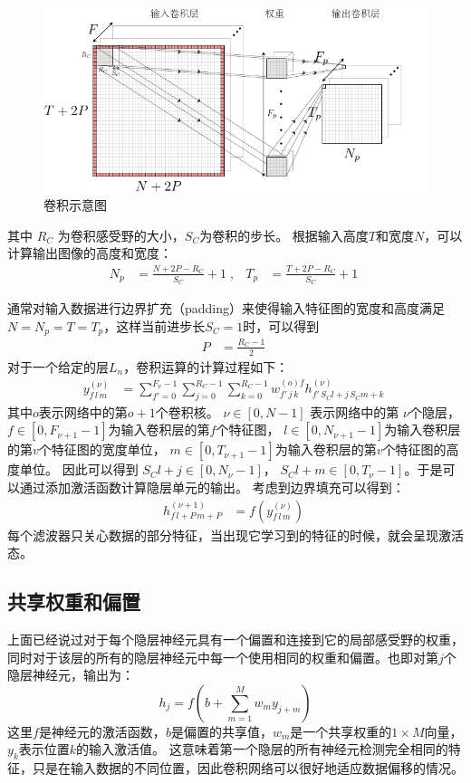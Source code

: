 \begin{figure}[!t]
	\centering
  \includegraphics[width=13.5cm]{figures/networks/conv}
	\caption{卷积示意图}
	\label{fig:conv}
\end{figure}

其中 $R_C$ 为卷积感受野的大小，$S_C$为卷积的步长。
根据输入高度$ T $和宽度$ N $，可以计算输出图像的高度和宽度：
\begin{align}
  N_p&=\frac{N+2P-R_C}{S_C}+1 \;,&
  T_p&=\frac{T+2P-R_C}{S_C}+1\;
\end{align}

通常对输入数据进行边界扩充（padding）来使得输入特征图的宽度和高度满足$ N = N_p = T = T_p $，这样当前进步长$ S_C = 1 $时，可以得到
\begin{align}
P&=\frac{R_C-1}{2}\;
\end{align}
对于一个给定的层$ L_n $，卷积运算的计算过程如下：
\begin{align}
y_{f\,l\,m}^{(\nu)}&=\sum^{F_\nu-1}_{f'=0}\sum^{R_C-1}_{j=0}\sum^{R_C-1}_{k=0}
%
w^{(o)f}_{f'\,j\,k}h^{(\nu)}_{f'\,S_Cl+j\,S_Cm+k}\;
\end{align}
其中$ o $表示网络中的第$ o + 1 $个卷积核。
$\nu \in [0,N-1 ]$ 表示网络中的第 $\nu$个隐层，$f\in[0,F_{\nu+1}-1]$为输入卷积层的第$f$个特征图， $l\in[0,N_{\nu+1}-1 ]$为输入卷积层的第$v$个特征图的宽度单位， $m\in[0,T_{\nu+1}-1 ]$为输入卷积层的第$v$个特征图的高度单位。 因此可以得到 $S_Cl+j\in[0,N_\nu-1 ]$， $S_Cl+m\in[0,T_\nu-1 ]$。于是可以通过添加激活函数计算隐层单元的输出。
考虑到边界填充可以得到：
\begin{align}
h_{f\,l+P\,m+P}^{(\nu+1)}&=f\left(y_{f\,l\,m}^{(\nu)}\right)\;
\end{align}
每个滤波器只关心数据的部分特征，当出现它学习到的特征的时候，就会呈现激活态。

\subsection{共享权重和偏置}
上面已经说过对于每个隐层神经元具有一个偏置和连接到它的局部感受野的权重，同时对于该层的所有的隐层神经元中每一个使用相同的权重和偏置。也即对第$j$个隐层神经元，输出为：
\begin{equation}
  h_j = f(b+\sum_{m=1}^M w_m y_{j+m})
  \label{equ:shared_weight}
\end{equation}
这里$f$是神经元的激活函数，$b$是偏置的共享值，$w_m$是一个共享权重的$1\times M$向量，$y_k$表示位置$k$的输入激活值。
这意味着第一个隐层的所有神经元检测完全相同的特征，只是在输入数据的不同位置，因此卷积网络可以很好地适应数据偏移的情况。

